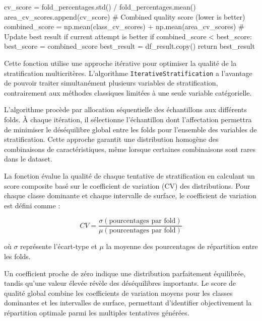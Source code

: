 \begin{code}[H]
\begin{pythoncode}
                cv_score = fold_percentages.std() / fold_percentages.mean()
                area_cv_scores.append(cv_score)
            # Combined quality score (lower is better)
            combined_score = np.mean(class_cv_scores) + np.mean(area_cv_scores)
            # Update best result if current attempt is better
            if combined_score < best_score:
                best_score = combined_score
                best_result = df_result.copy()
        return best_result
    \end{pythoncode}
    \label{code:post_traitement_stratification}
\end{code}

Cette fonction utilise une approche itérative pour optimiser la qualité de la stratification multicritères. L'algorithme \texttt{IterativeStratification} a l'avantage de pouvoir traiter simultanément plusieurs variables de stratification, contrairement aux méthodes classiques limitées à une seule variable catégorielle.

L'algorithme procède par allocation séquentielle des échantillons aux différents folds. À chaque itération, il sélectionne l'échantillon dont l'affectation permettra de minimiser le déséquilibre global entre les folds pour l'ensemble des variables de stratification. Cette approche garantit une distribution homogène des combinaisons de caractéristiques, même lorsque certaines combinaisons sont rares dans le dataset.

La fonction évalue la qualité de chaque tentative de stratification en calculant un score composite basé sur le coefficient de variation (CV) des distributions. Pour chaque classe dominante et chaque intervalle de surface, le coefficient de variation est défini comme :

\vspace{0.35cm}
\begin{equation}
    CV = \frac{\sigma(\text{pourcentages par fold})}{\mu(\text{pourcentages par fold})}
\end{equation}
\vspace{0.05cm}

où $\sigma$ représente l'écart-type et $\mu$ la moyenne des pourcentages de répartition entre les folds.

Un coefficient proche de zéro indique une distribution parfaitement équilibrée, tandis qu'une valeur élevée révèle des déséquilibres importants. Le score de qualité global combine les coefficients de variation moyens pour les classes dominantes et les intervalles de surface, permettant d'identifier objectivement la répartition optimale parmi les multiples tentatives générées.

